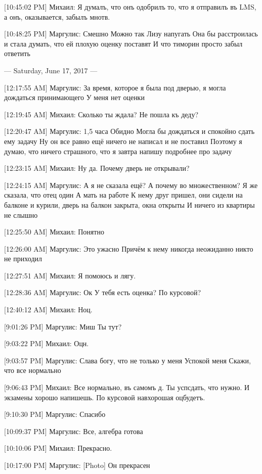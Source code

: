 \documentclass{article}
\newcommand{\yat}{{\fontencoding{X2}\selectfont\cyryat}} %
\begin{document}
[10:45:02 PM] Михаил:
Я думалъ, что онъ одобрилъ то, что я отправилъ въ LMS, а онъ, оказывается, забылъ мн\yat отв.

[10:48:25 PM] Маргулис:
Смешно
 Можно так Лизу напугать
 Она бы расстроилась и стала думать, что ей плохую оценку поставят
 И что тиморин просто забыл ответить

--- Saturday, June 17, 2017 ---

[12:17:55 AM] Маргулис:
За время, которое я была под дверью, я могла дождаться принимающего
 У меня нет оценки

[12:19:45 AM] Михаил:
Сколько ты ждала? Не пошла къ деду?

[12:20:47 AM] Маргулис:
1,5 часа
 Обидно
 Могла бы дождаться и спокойно сдать ему задачу
 Ну он все равно ещё ничего не написал и не поставил
 Поэтому я думаю, что ничего страшного, что я завтра напишу подробнее про задачу

[12:23:15 AM] Михаил:
Ну да. Почему дверь не открывали?

[12:24:15 AM] Маргулис:
А я не сказала ещё?
 А почему во множественном?
 Я же сказала, что отец один
 А мать на работе
 К нему друг пришел, они сидели на балконе и курили, дверь на балкон закрыта, окна открыты
 И ничего из квартиры не слышно

[12:25:50 AM] Михаил:
Понятно

[12:26:00 AM] Маргулис:
Это ужасно
 Причём к нему никогда неожиданно никто не приходил

[12:27:51 AM] Михаил:
Я помоюсь и лягу.

[12:28:36 AM] Маргулис:
Ок
 У тебя есть оценка?
 По курсовой?

[12:40:12 AM] Михаил:
Н оц.

[9:01:26 PM] Маргулис:
Миш
 Ты тут?

[9:03:22 PM] Михаил:
Оц н.

[9:03:57 PM] Маргулис:
Слава богу, что не только у меня
 Успокой меня
 Скажи, что все нормально

[9:06:43 PM] Михаил:
Все нормально, въ самомъ д\yatл\yat. Ты усп сдать, что нужно. И экзамены хорошо напишешь.
 По курсовой нав хорошая оц будетъ.

[9:10:30 PM] Маргулис:
Спасибо

[10:09:37 PM] Маргулис:
Все, алгебра готова

[10:10:06 PM] Михаил:
Прекрасно.

[10:17:00 PM] Маргулис:
[Photo]
 Он прекрасен
\end{document}
